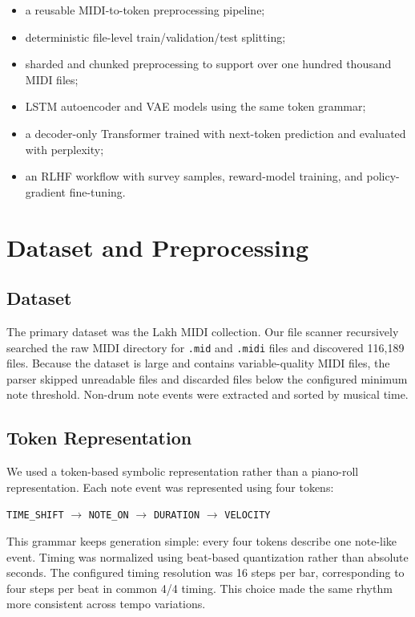 \documentclass{article}
\begin{document}
\begin{itemize}[leftmargin=*]
    \item a reusable MIDI-to-token preprocessing pipeline;
    \item deterministic file-level train/validation/test splitting;
    \item sharded and chunked preprocessing to support over one hundred thousand MIDI files;
    \item LSTM autoencoder and VAE models using the same token grammar;
    \item a decoder-only Transformer trained with next-token prediction and evaluated with perplexity;
    \item an RLHF workflow with survey samples, reward-model training, and policy-gradient fine-tuning.
\end{itemize}

\section{Dataset and Preprocessing}

\subsection{Dataset}
The primary dataset was the Lakh MIDI collection. Our file scanner recursively searched the raw MIDI directory for \texttt{.mid} and \texttt{.midi} files and discovered 116,189 files. Because the dataset is large and contains variable-quality MIDI files, the parser skipped unreadable files and discarded files below the configured minimum note threshold. Non-drum note events were extracted and sorted by musical time.

\subsection{Token Representation}
We used a token-based symbolic representation rather than a piano-roll representation. Each note event was represented using four tokens:

\begin{center}
\texttt{TIME\_SHIFT} $\rightarrow$ \texttt{NOTE\_ON} $\rightarrow$ \texttt{DURATION} $\rightarrow$ \texttt{VELOCITY}
\end{center}

This grammar keeps generation simple: every four tokens describe one note-like event. Timing was normalized using beat-based quantization rather than absolute seconds. The configured timing resolution was 16 steps per bar, corresponding to four steps per beat in common 4/4 timing. This choice made the same rhythm more consistent across tempo variations.
\end{document}

